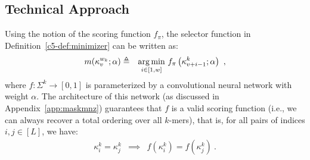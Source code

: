 \subsection{Technical Approach}
Using the notion of the scoring function $f_\pi$, the selector function in Definition~\ref{c5-def:minimizer} can be written as:
\begin{eqnarray}
m(\kappa^{w_k}_v; \alpha) &\triangleq& \underset{i \in [1,w]}{\operatorname{\arg\min}} \ f_\pi\left(\kappa^k_{v+i-1}; \alpha\right) \ ,
\label{eq:mnzselector}
\end{eqnarray}
where $f: \Sigma^{k} \rightarrow [0, 1]$ is parameterized by a convolutional neural network with weight $\alpha$. The architecture of this network (as discussed in Appendix~\ref{app:maskmnz}) guarantees that $f$ is a valid scoring function (i.e., we can always recover a total ordering over all $k$-mers), that is, for all pairs of indices $i, j \in [L]$, we have:
\begin{eqnarray}
\kappa^k_i = \kappa^k_j &\implies& f(\kappa^k_i) = f(\kappa^k_j) \ .
\end{eqnarray}

